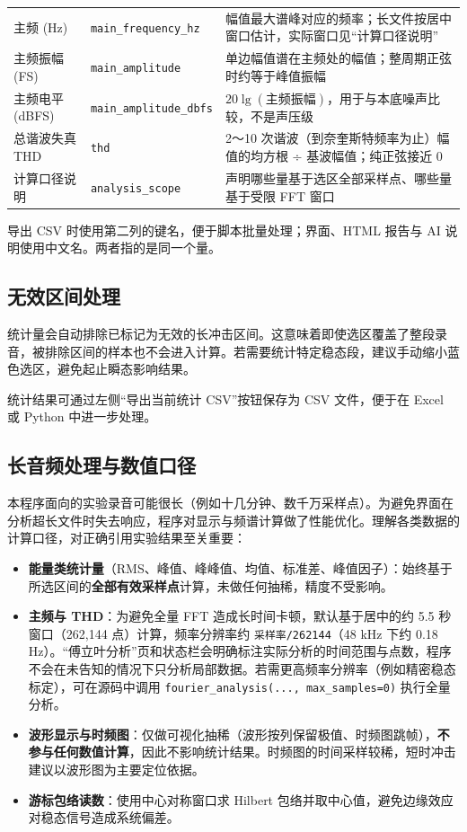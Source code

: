 \documentclass[UTF8,a4paper,12pt,scheme=chinese]{ctexart}
\begin{document}
{\begin{longtable}{@{}p{}p{}p{}@{}}
主频 (Hz) & \texttt{main\_frequency\_hz} & 幅值最大谱峰对应的频率；长文件按居中窗口估计，实际窗口见“计算口径说明” \\
主频振幅 (FS) & \texttt{main\_amplitude} & 单边幅值谱在主频处的幅值；整周期正弦时约等于峰值振幅 \\
主频电平 (dBFS) & \texttt{main\_amplitude\_dbfs} & $20\lg(\text{主频振幅})$，用于与本底噪声比较，不是声压级 \\
总谐波失真 THD & \texttt{thd} & 2～10 次谐波（到奈奎斯特频率为止）幅值的均方根 ÷ 基波幅值；纯正弦接近 0 \\
计算口径说明 & \texttt{analysis\_scope} & 声明哪些量基于选区全部采样点、哪些量基于受限 FFT 窗口 \\
\end{longtable}
}

导出 CSV 时使用第二列的键名，便于脚本批量处理；界面、HTML 报告与 AI 说明使用中文名。两者指的是同一个量。

\subsection{无效区间处理}

统计量会自动排除已标记为无效的长冲击区间。这意味着即使选区覆盖了整段录音，被排除区间的样本也不会进入计算。若需要统计特定稳态段，建议手动缩小蓝色选区，避免起止瞬态影响结果。

统计结果可通过左侧“导出当前统计 CSV”按钮保存为 CSV 文件，便于在 Excel 或 Python 中进一步处理。

\subsection{长音频处理与数值口径}

本程序面向的实验录音可能很长（例如十几分钟、数千万采样点）。为避免界面在分析超长文件时失去响应，程序对显示与频谱计算做了性能优化。理解各类数据的计算口径，对正确引用实验结果至关重要：

\begin{itemize}
  \item \textbf{能量类统计量}（RMS、峰值、峰峰值、均值、标准差、峰值因子）：始终基于所选区间的\textbf{全部有效采样点}计算，未做任何抽稀，精度不受影响。
  \item \textbf{主频与 THD}：为避免全量 FFT 造成长时间卡顿，默认基于居中的约 5.5 秒窗口（262,144 点）计算，频率分辨率约 \texttt{采样率/262144}（48 kHz 下约 0.18 Hz）。“傅立叶分析”页和状态栏会明确标注实际分析的时间范围与点数，程序不会在未告知的情况下只分析局部数据。若需更高频率分辨率（例如精密稳态标定），可在源码中调用 \texttt{fourier\_analysis(..., max\_samples=0)} 执行全量分析。
  \item \textbf{波形显示与时频图}：仅做可视化抽稀（波形按列保留极值、时频图跳帧），\textbf{不参与任何数值计算}，因此不影响统计结果。时频图的时间采样较稀，短时冲击建议以波形图为主要定位依据。
  \item \textbf{游标包络读数}：使用中心对称窗口求 Hilbert 包络并取中心值，避免边缘效应对稳态信号造成系统偏差。
\end{itemize}
\end{document}
